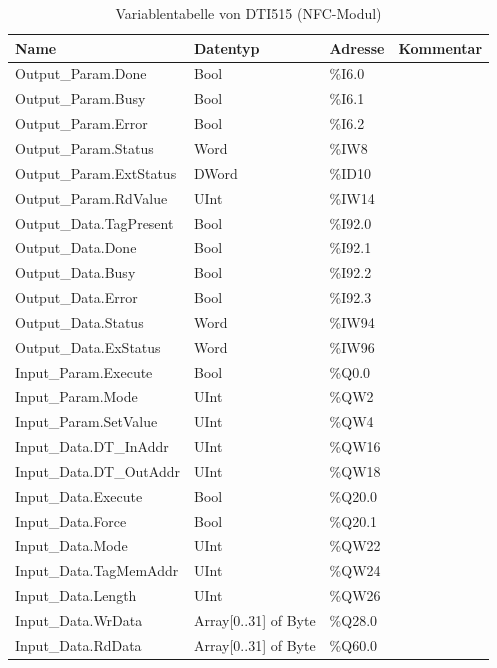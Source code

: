 \begin{table}[h!]
	\centering
	\renewcommand{\arraystretch}{1.0} %
	\footnotesize
	\begin{tabular}{|l|l|l|l|}
		\hline
		\textbf{Name} & \textbf{Datentyp} & \textbf{Adresse} & \textbf{Kommentar} \\ \hline
		Output\_Param.Done & Bool & \%I6.0 & \\ \hline
		Output\_Param.Busy & Bool & \%I6.1 & \\ \hline
		Output\_Param.Error & Bool & \%I6.2 & \\ \hline
		Output\_Param.Status & Word & \%IW8 & \\ \hline
		Output\_Param.ExtStatus & DWord & \%ID10 & \\ \hline
		Output\_Param.RdValue & UInt & \%IW14 & \\ \hline
		Output\_Data.TagPresent & Bool & \%I92.0 & \\ \hline
		Output\_Data.Done & Bool & \%I92.1 & \\ \hline
		Output\_Data.Busy & Bool & \%I92.2 & \\ \hline
		Output\_Data.Error & Bool & \%I92.3 & \\ \hline
		Output\_Data.Status & Word & \%IW94 & \\ \hline
		Output\_Data.ExStatus & Word & \%IW96 & \\ \hline
		Input\_Param.Execute & Bool & \%Q0.0 & \\ \hline
		Input\_Param.Mode & UInt & \%QW2 & \\ \hline
		Input\_Param.SetValue & UInt & \%QW4 & \\ \hline
		Input\_Data.DT\_InAddr & UInt & \%QW16 & \\ \hline
		Input\_Data.DT\_OutAddr & UInt & \%QW18 & \\ \hline
		Input\_Data.Execute & Bool & \%Q20.0 & \\ \hline
		Input\_Data.Force & Bool & \%Q20.1 & \\ \hline
		Input\_Data.Mode & UInt & \%QW22 & \\ \hline
		Input\_Data.TagMemAddr & UInt & \%QW24 & \\ \hline
		Input\_Data.Length & UInt & \%QW26 & \\ \hline
		Input\_Data.WrData & Array[0..31] of Byte & \%Q28.0 & \\ \hline
		Input\_Data.RdData & Array[0..31] of Byte & \%Q60.0 & \\ \hline
	\end{tabular}
	\caption{Variablentabelle von DTI515 (NFC-Modul)}
	\label{tab:DTI515}
\end{table}

\clearpage


